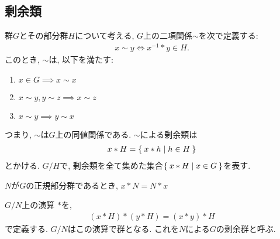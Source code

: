 \subsection{剰余類}
  群$G$とその部分群$H$について考える,
  $G$上の二項関係$\sim$を次で定義する:
  \begin{align*}
    x\sim y\iff x^{-1}\ast y\in H.
  \end{align*}
  このとき, $\sim$は, 以下を満たす:
  \begin{enumerate}
    \item $x\in G \implies x\sim x$
    \item $x\sim y, y\sim z \implies x\sim z$
    \item $x\sim y \implies y\sim x$
  \end{enumerate}
  つまり, $\sim$は$G$上の同値関係である.
  $\sim$による剰余類は
  \begin{align*}
    x\ast H = \Set{x\ast h|h\in H} 
  \end{align*}
  とかける.
  $G/H$で, 剰余類を全て集めた集合$\Set{x\ast H| x\in G}$を表す.

  \begin{lemma}
    $N$が$G$の正規部分群であるとき,
    $x\ast N = N\ast x$
  \end{lemma}

  $G/N$上の演算 $*$を,
  \begin{align*}
    (x\ast H) * (y\ast H) = (x\ast y)\ast H
  \end{align*}
  で定義する.
  $G/N$はこの演算で群となる.
  これを$N$による$G$の剰余群と呼ぶ.

